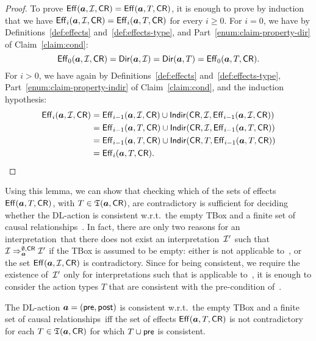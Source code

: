 \begin{proof}
    To prove $\operatorname{\mathsf{Eff}}(\boldsymbol a,\mathcal{I},\mathsf{CR})=\operatorname{\mathsf{Eff}}(\boldsymbol a,T,\mathsf{CR})$, it is enough to prove by
    induction that we have $\operatorname{\mathsf{Eff}}_i(\boldsymbol a,\mathcal{I},\mathsf{CR})=\operatorname{\mathsf{Eff}}_i(\boldsymbol a,T,\mathsf{CR})$ for every
    $i\ge 0$.
    For $i=0$, we have by Definitions~\ref{def:effects}
    and~\ref{def:effects-type}, and Part~\ref{enum:claim-property-dir} of
    Claim~\ref{claim:cond}:
    \[\operatorname{\mathsf{Eff}}_0(\boldsymbol a,\mathcal{I},\mathsf{CR})=\operatorname{\mathsf{Dir}}(\boldsymbol a,\mathcal{I})=\operatorname{\mathsf{Dir}}(\boldsymbol a,T)=\operatorname{\mathsf{Eff}}_0(\boldsymbol a,T,\mathsf{CR}).\]
    For $i>0$, we have again by Definitions~\ref{def:effects}
    and~\ref{def:effects-type}, Part~\ref{enum:claim-property-indir} of
    Claim~\ref{claim:cond}, and the induction hypothesis:
    \begin{align*}
        \operatorname{\mathsf{Eff}}_i(\boldsymbol a,\mathcal{I},\mathsf{CR})
        &=\operatorname{\mathsf{Eff}}_{i-1}(\boldsymbol a,\mathcal{I},\mathsf{CR})\cup\operatorname{\mathsf{Indir}}(\mathsf{CR},\mathcal{I},\operatorname{\mathsf{Eff}}_{i-1}(\boldsymbol a,\mathcal{I},\mathsf{CR}))\\
        &=\operatorname{\mathsf{Eff}}_{i-1}(\boldsymbol a,T,\mathsf{CR})\cup\operatorname{\mathsf{Indir}}(\mathsf{CR},\mathcal{I},\operatorname{\mathsf{Eff}}_{i-1}(\boldsymbol a,T,\mathsf{CR}))\\
        &=\operatorname{\mathsf{Eff}}_{i-1}(\boldsymbol a,T,\mathsf{CR})\cup\operatorname{\mathsf{Indir}}(\mathsf{CR},T,\operatorname{\mathsf{Eff}}_{i-1}(\boldsymbol a,T,\mathsf{CR}))\\
        &=\operatorname{\mathsf{Eff}}_i(\boldsymbol a,T,\mathsf{CR}).
    \end{align*}
\end{proof}

\noindent
Using this lemma, we can show that checking which of the sets of effects
$\operatorname{\mathsf{Eff}}(\boldsymbol a,T,\mathsf{CR})$, with $T\in\mathfrak{T}(\boldsymbol a,\mathsf{CR})$, are contradictory is sufficient
for deciding whether the DL-action \abf is consistent w.r.t.\ the empty TBox and
a finite set of causal relationships~\CR.  In fact, there are only two reasons
for an interpretation~\Imc that there does not exist an interpretation~$\mathcal{I}'$
such that $\mathcal{I}\Rightarrow_{\boldsymbol a}^{\emptyset,\mathsf{CR}}\mathcal{I}'$ if the TBox is assumed
to be empty: either \abf is not applicable to~\Imc, or the set
$\operatorname{\mathsf{Eff}}(\boldsymbol a,\mathcal{I},\mathsf{CR})$ is contradictory.  Since for \abf being consistent, we
require the existence of~$\mathcal{I}'$ only for interpretations \Imc such that \abf is
applicable to~\Imc, it is enough to consider the action types $T$ that are
consistent with the pre-condition of~\abf.

\begin{lemma}\label{lem:consistency-no-tbox}
    The DL-action $\boldsymbol a=(\mathsf{pre},\mathsf{post})$ is consistent w.r.t.\ the
    empty TBox and a finite set of causal relationships~\CR iff the set of
    effects $\operatorname{\mathsf{Eff}}(\boldsymbol a,T,\mathsf{CR})$ is not contradictory for each
    $T\in\mathfrak{T}(\boldsymbol a,\mathsf{CR})$ for which $T\cup\mathsf{pre}$ is consistent.
\end{lemma}

